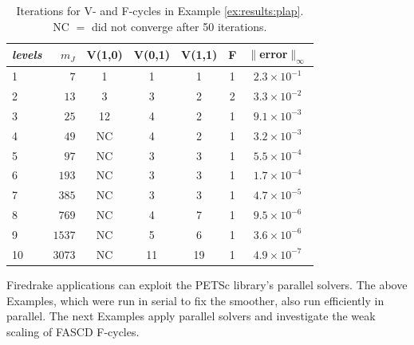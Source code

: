 \documentclass[review,hidelinks,onefignum,onetabnum]{siamart220329}
\begin{document}
\begin{table}[ht]
\centering
\begin{tabular}{lr@{\hskip 7mm}c@{\hskip 3mm}c@{\hskip 3mm}c@{\hskip 4mm}c@{\hskip 6mm}c}
\toprule
\emph{levels} & $m_J$ & V(1,0) & V(0,1) & V(1,1) & F & $\|$error$\|_\infty$ \\
\midrule
 1 &    $7$ &  1 &  1 &  1 &  1 & $2.3\times 10^{-1}$ \\
 2 &   $13$ &  3 &  3 &  2 &  2 & $3.3 \times 10^{-2}$ \\
 3 &   $25$ & 12 &  4 &  2 &  1 & $9.1 \times 10^{-3}$ \\
 4 &   $49$ & NC &  4 &  2 &  1 & $3.2 \times 10^{-3}$ \\
 5 &   $97$ & NC &  3 &  3 &  1 & $5.5 \times 10^{-4}$ \\
 6 &  $193$ & NC &  3 &  3 &  1 & $1.7 \times 10^{-4}$ \\
 7 &  $385$ & NC &  3 &  3 &  1 & $4.7 \times 10^{-5}$ \\
 8 &  $769$ & NC &  4 &  7 &  1 & $9.5 \times 10^{-6}$ \\
 9 & $1537$ & NC &  5 &  6 &  1 & $3.6 \times 10^{-6}$ \\
10 & $3073$ & NC & 11 & 19 &  1 & $4.9 \times 10^{-7}$ \\
\bottomrule
\end{tabular}
\bigskip
\caption{Iterations for V- and F-cycles in Example \ref{ex:results:plap}.  NC $=$ did not converge after 50 iterations.}
\label{tab:results:fastplap1d}
\end{table}

Firedrake applications can exploit the PETSc \cite{Balayetal2023} library's parallel solvers.  The above Examples, which were run in serial to fix the smoother, also run efficiently in parallel.  The next Examples apply parallel solvers and investigate the weak scaling of FASCD F-cycles.
\end{document}
